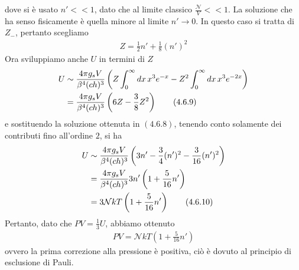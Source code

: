 \documentclass{article}
\begin{document}
dove si è usato $n' << 1$, dato che al limite classico $\frac{\mathcal{N}}{V} << 1$. La soluzione che ha senso fisicamente è quella minore al limite $n' \rightarrow 0$. In questo caso si tratta di $Z_-$, pertanto scegliamo
\begin{align}
    Z = \frac{1}{2}n' + \frac{1}{8}(n')^2 \tag{4.6.8}
\end{align}
Ora sviluppiamo anche $U$ in termini di $Z$
\begin{align}
    U &\sim \frac{4\pi g_sV}{\beta^4(ch)^3}\left(Z\int_0^\infty dx \, x^3e^{-x} - Z^2\int_0^\infty dx \, x^3e^{-2x}\right) \notag \\
    &= \frac{4\pi g_sV}{\beta^4(ch)^3}\left(6Z - \frac{3}{8}Z^2\right) \tag{4.6.9}
\end{align}
e sostituendo la soluzione ottenuta in $(4.6.8)$, tenendo conto solamente dei contributi fino all'ordine $2$, si ha
\begin{align}
    U &\sim \frac{4\pi g_sV}{\beta^4(ch)^3}\left(3n' - \frac{3}{4}(n')^2 - \frac{3}{16}(n')^2\right) \notag \\
    &= \frac{4\pi g_sV}{\beta^4(ch)^3}3n'\left(1 + \frac{5}{16}n'\right) \notag \\
    &= 3\mathcal{N}kT\left(1 + \frac{5}{16}n'\right) \tag{4.6.10}
\end{align}
Pertanto, dato che $PV = \frac{1}{3}U$, abbiamo ottenuto
\begin{align}
    PV = \mathcal{N}kT\left(1 + \frac{5}{16}n'\right) \tag{4.6.11}
\end{align}
ovvero la prima correzione alla pressione è positiva, ciò è dovuto al principio di esclusione di Pauli.

\newpage
\end{document}
